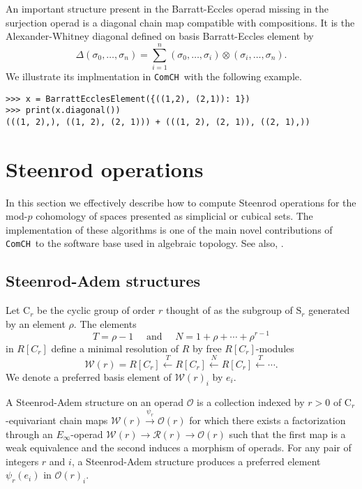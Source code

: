 \documentclass{amsart}
\newcommand{\comch}{\texttt{ComCH}}
\begin{document}
An important structure present in the Barratt-Eccles operad missing in the surjection operad is a diagonal chain map compatible with compositions. It is the Alexander-Whitney diagonal defined on basis Barratt-Eccles element by
\begin{equation*}
\Delta(\sigma_0, \dots, \sigma_n) = \sum_{i=1}^n (\sigma_0, \dots, \sigma_i) \otimes (\sigma_i, \dots, \sigma_n).
\end{equation*}
We illustrate its implmentation in \comch\, with the following example.
\begin{verbatim}
>>> x = BarrattEcclesElement({((1,2), (2,1)): 1})
>>> print(x.diagonal())
(((1, 2),), ((1, 2), (2, 1))) + (((1, 2), (2, 1)), ((2, 1),))
\end{verbatim}

\section{Steenrod operations}

In this section we effectively describe how to compute Steenrod operations for the mod-$p$ cohomology of spaces presented as simplicial or cubical sets. The implementation of these algorithms is one of the main novel contributions of \comch\, to the software base used in algebraic topology. See also, \cite{}.

\subsection{Steenrod-Adem structures}

Let $\mathrm{C}_r$ be the cyclic group of order $r$ thought of as the subgroup of $\mathrm{S}_r$ generated by an element $\rho$. The elements
\begin{equation*}
T = \rho-1 \quad \text{ and } \quad N = 1+\rho+\cdots+\rho^{r-1}
\end{equation*}
in $R[C_r]$ define a minimal resolution of $R$ by free $R[C_r]$-modules
\begin{equation*}
\mathcal W(r) = R[C_r] \stackrel{T}{\longleftarrow} R[C_r] \stackrel{N}{\longleftarrow} R[C_r] \stackrel{T}{\longleftarrow} \cdots.
\end{equation*}
We denote
a preferred basis element of $\mathcal W(r)_i$ by $e_i$.

A Steenrod-Adem structure on an operad $\mathcal O$ is a collection indexed by $r > 0$ of $\mathrm C_r$-equivariant chain maps $\mathcal W(r) \stackrel{\psi_r}{\longrightarrow} \mathcal O(r)$ for which there exists a factorization through an $E_\infty$-operad $\mathcal W(r) \to \mathcal R(r) \to \mathcal O(r)$ such that the first map is a weak equivalence and the second induces a morphism of operads.
For any pair of integers $r$ and $i$, a Steenrod-Adem structure produces a preferred element $\psi_r(e_i)$ in $\mathcal O(r)_i$.
\end{document}
